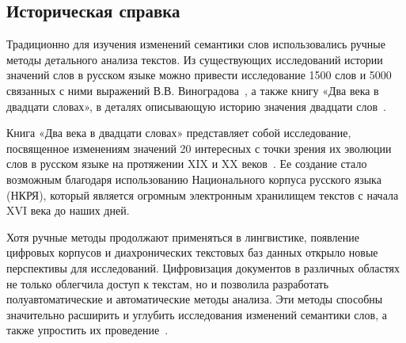 \documentclass[LI,VKR]{HSEUniversity}
\begin{document}
\subsection{Историческая справка}
Традиционно для изучения изменений семантики слов использовались ручные методы детального
анализа текстов.
Из существующих исследований истории значений слов в русском языке можно привести
исследование 1500 слов и 5000 связанных с ними выражений В.В. Виноградова~\cite{VinogradovWordHistory},
а также книгу «Два века в двадцати словах», в деталях описывающую историю значения двадцати слов~\cite{TwoCenturies}.


Книга «Два века в двадцати словах» представляет собой исследование,
посвященное изменениям значений 20 интересных с точки зрения их эволюции слов в русском языке на
протяжении XIX и XX веков~\cite{TwoCenturies}.
Ее создание стало возможным благодаря использованию Национального корпуса русского языка (НКРЯ),
который является огромным электронным хранилищем текстов с начала XVI века до наших дней.


Хотя ручные методы продолжают применяться в лингвистике,
появление цифровых корпусов и диахронических текстовых баз данных открыло новые перспективы для исследований.
Цифровизация документов в различных областях не только облегчила доступ к текстам,
но и позволила разработать полуавтоматические и автоматические методы анализа.
Эти методы способны значительно расширить и углубить исследования изменений семантики слов,
а также упростить их проведение~\cite{TahmasebiComputationalApproachesToSemanticChange}.
\end{document}
